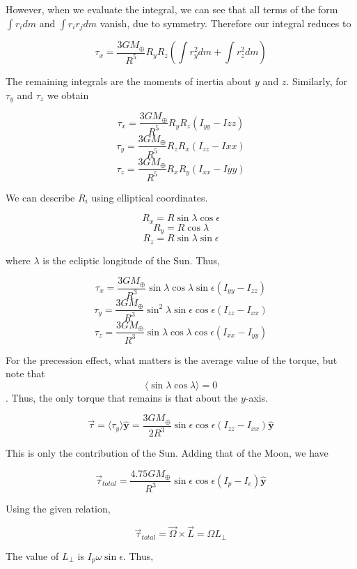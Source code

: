 \documentclass[11pt]{article}
\begin{document}
\begin{pproblem}
\begin{pssolution*}{}{}
\begin{alternativas}
            However, when we evaluate the integral, we can see that all terms of the form \(\int r_i dm \) and \(\int r_ir_jdm\) vanish, due to symmetry. Therefore our integral reduces to

            \[\tau_x = \frac{3GM_\oplus}{R^5}R_yR_z\left(\int r_y^2dm + \int r_z^2dm\right)\]

            The remaining integrals are the moments of inertia about \(y\) and \(z\). Similarly, for \(\tau_y\) and \(\tau_z\) we obtain

            \[\tau_x = \frac{3GM_\oplus}{R^5}R_yR_z (I_{yy}-I{zz})\]
            \[\tau_y = \frac{3GM_\oplus}{R^5}R_zR_x (I_{zz}-I{xx})\]
            \[\tau_z = \frac{3GM_\oplus}{R^5}R_xR_y (I_{xx}-I{yy})\]

            We can describe \(R_i\) using elliptical coordinates.

            \[R_x = R\sin\lambda \cos\epsilon\]
            \[R_y = R\cos\lambda\]
            \[R_z = R\sin\lambda\sin\epsilon\]

            where \(\lambda\) is the ecliptic longitude of the Sun. Thus,

            \[\tau_x = \frac{3GM_\oplus}{R^3}\sin\lambda\cos\lambda\sin\epsilon (I_{yy}-I_{zz})\]
            \[\tau_y = \frac{3GM_\oplus}{R^3} \sin^2\lambda\sin\epsilon\cos\epsilon(I_{zz}-I_{xx})\]
            \[\tau_z = \frac{3GM_\oplus}{R^3} \sin\lambda\cos\lambda\cos\epsilon(I_{xx}-I_{yy})\]

            For the precession effect, what matters is the average value of the torque, but note that \[\langle\sin\lambda\cos\lambda\rangle = 0\]. Thus, the only torque that remains is that about the \(y\)-axis.

            \[\vec\tau  = \langle\tau_y\rangle\mathbf{\hat{y}} = \frac{3GM_\oplus}{2R^3}\sin\epsilon\cos\epsilon (I_{zz}-I_{xx})\mathbf{\hat{y}}\]

            This is only the contribution of the Sun. Adding that of the Moon, we have

            \[\boxed{\vec\tau_{total} = \frac{4.75GM_\oplus}{R^3}\sin\epsilon\cos\epsilon (I_{p}-I_{e})\mathbf{\hat{y}}}\]

            \item Using the given relation,
            
            \[\vec\tau_{total} = \vec\Omega \times \vec L = \Omega L_\perp\]

            The value of \(L_\perp\) is \(I_p\omega\sin\epsilon\). Thus,


\end{alternativas}
\end{pssolution*}
\end{pproblem}
\end{document}
